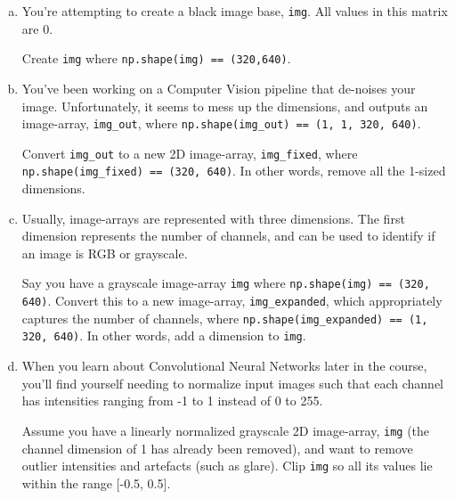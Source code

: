 \begin{enumerate}[(a)]
    \item You're attempting to create a black image base, \texttt{img}. All values in this matrix are 0. 
    
    Create \texttt{img} where \texttt{np.shape(img) == (320,640)}.
    
    
    \item You've been working on a Computer Vision pipeline that de-noises your image. Unfortunately, it seems to mess up the dimensions, and outputs an image-array, \texttt{img\_out}, where \texttt{np.shape(img\_out) == (1, 1, 320, 640)}. 
    
    Convert \texttt{img\_out} to a new 2D image-array, \texttt{img\_fixed}, where \texttt{np.shape(img\_fixed) == (320, 640)}. In other words, remove all the 1-sized dimensions.
    
    
    \item Usually, image-arrays are represented with three dimensions. The first dimension represents the number of channels, and can be used to identify if an image is RGB or grayscale. 
    
    Say you have a grayscale image-array \texttt{img} where \texttt{np.shape(img) == (320, 640)}. Convert this to a new image-array, \texttt{img\_expanded}, which appropriately captures the number of channels, where \texttt{np.shape(img\_expanded) == (1, 320, 640)}. In other words, add a dimension to \texttt{img}.
    
    
    \item When you learn about Convolutional Neural Networks later in the course, you'll find yourself needing to normalize input images such that each channel has intensities ranging from -1 to 1 instead of 0 to 255.
    
    Assume you have a linearly normalized grayscale 2D image-array, \texttt{img} (the channel dimension of 1 has already been removed), and want to remove outlier intensities and artefacts (such as glare). Clip \texttt{img} so all its values lie within the range [-0.5, 0.5].
    
    

\end{enumerate}
